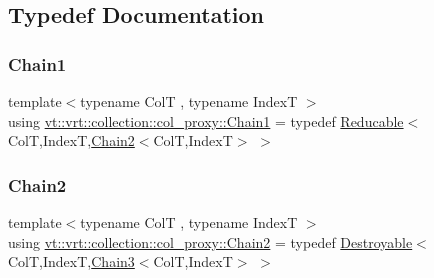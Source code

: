 \subsection{Typedef Documentation}
\mbox{\label{namespacevt_1_1vrt_1_1collection_1_1col__proxy_a829dc1f247cb9518d83ccfb6ca9158a9}} 
\subsubsection{\texorpdfstring{Chain1}{Chain1}}
{\footnotesize\ttfamily template$<$typename ColT , typename IndexT $>$ \\
using \hyperlink{namespacevt_1_1vrt_1_1collection_1_1col__proxy_a829dc1f247cb9518d83ccfb6ca9158a9}{vt\+::vrt\+::collection\+::col\+\_\+proxy\+::\+Chain1} = typedef \hyperlink{structvt_1_1vrt_1_1collection_1_1_reducable}{Reducable}$<$ColT,IndexT,\hyperlink{namespacevt_1_1vrt_1_1collection_1_1col__proxy_a0c21e18852e5deea513629fe02399bb5}{Chain2}$<$ColT,IndexT$>$ $>$}

\mbox{\label{namespacevt_1_1vrt_1_1collection_1_1col__proxy_a0c21e18852e5deea513629fe02399bb5}} 
\subsubsection{\texorpdfstring{Chain2}{Chain2}}
{\footnotesize\ttfamily template$<$typename ColT , typename IndexT $>$ \\
using \hyperlink{namespacevt_1_1vrt_1_1collection_1_1col__proxy_a0c21e18852e5deea513629fe02399bb5}{vt\+::vrt\+::collection\+::col\+\_\+proxy\+::\+Chain2} = typedef \hyperlink{structvt_1_1vrt_1_1collection_1_1_destroyable}{Destroyable}$<$ColT,IndexT,\hyperlink{namespacevt_1_1vrt_1_1collection_1_1col__proxy_aa83ea97afbf21f975d02b933af0ee42c}{Chain3}$<$ColT,IndexT$>$ $>$}

\mbox{\label{namespacevt_1_1vrt_1_1collection_1_1col__proxy_aa83ea97afbf21f975d02b933af0ee42c}} 

